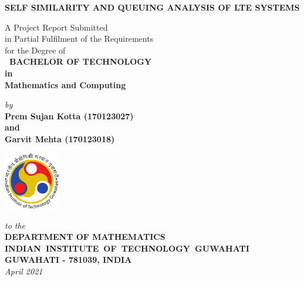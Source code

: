 \documentclass[12pt,a4paper]{report}
\theoremstyle{plain}
\theoremstyle{definition}
\theoremstyle{remark}
\begin{document}


\begin{titlepage}
\enlargethispage{3cm}

\begin{center}

\vspace*{-2cm}

\textbf{\Large SELF SIMILARITY AND QUEUING ANALYSIS OF LTE SYSTEMS}

\vfill

 A Project Report Submitted \\
 in Partial Fulfilment of the Requirements\\
for the Degree of\\[1cm]


{\bf\Large\ BACHELOR OF TECHNOLOGY }\\[.1in]
\textbf{in}\\
\textbf{Mathematics and Computing}

 \vfill

{\large \emph{by}}\\[5pt]
{\large\bf {Prem Sujan Kotta (170123027)}}\\[5pt]
{\large\bf{and}}\\[5pt]
{\large\bf Garvit Mehta (170123018)}

\vfill
\includegraphics[height=2.5cm]{iitglogo}

\vspace*{0.5cm}

{\em\large to the}\\[10pt]
{\bf\large DEPARTMENT OF MATHEMATICS} \\[5pt]
{\bf\large \mbox{INDIAN INSTITUTE OF TECHNOLOGY GUWAHATI}}\\[5pt]
{\bf\large GUWAHATI - 781039, INDIA}\\[10pt]
{\it\large April 2021}
\end{center}

\end{titlepage}

\clearpage
\end{document}
